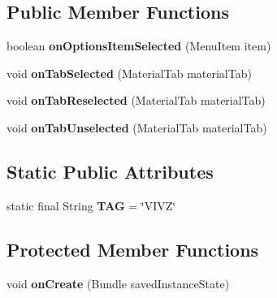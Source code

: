 \subsection*{Public Member Functions}
\begin{DoxyCompactItemize}
\item 
\hypertarget{classantardhvani_1_1du_1_1ac_1_1in_1_1_rules_1_1_rules__viewpager_a09f338b54341174baa0f5c41472619a9}{}boolean {\bfseries on\+Options\+Item\+Selected} (Menu\+Item item)\label{classantardhvani_1_1du_1_1ac_1_1in_1_1_rules_1_1_rules__viewpager_a09f338b54341174baa0f5c41472619a9}

\item 
\hypertarget{classantardhvani_1_1du_1_1ac_1_1in_1_1_rules_1_1_rules__viewpager_ad8bbe8937d526d7f0e01aefbcc0472f1}{}void {\bfseries on\+Tab\+Selected} (Material\+Tab material\+Tab)\label{classantardhvani_1_1du_1_1ac_1_1in_1_1_rules_1_1_rules__viewpager_ad8bbe8937d526d7f0e01aefbcc0472f1}

\item 
\hypertarget{classantardhvani_1_1du_1_1ac_1_1in_1_1_rules_1_1_rules__viewpager_adf1e7481079215663e69307de4caa99d}{}void {\bfseries on\+Tab\+Reselected} (Material\+Tab material\+Tab)\label{classantardhvani_1_1du_1_1ac_1_1in_1_1_rules_1_1_rules__viewpager_adf1e7481079215663e69307de4caa99d}

\item 
\hypertarget{classantardhvani_1_1du_1_1ac_1_1in_1_1_rules_1_1_rules__viewpager_a32f72a3fd78aaaaf97651450c0c06453}{}void {\bfseries on\+Tab\+Unselected} (Material\+Tab material\+Tab)\label{classantardhvani_1_1du_1_1ac_1_1in_1_1_rules_1_1_rules__viewpager_a32f72a3fd78aaaaf97651450c0c06453}

\end{DoxyCompactItemize}
\subsection*{Static Public Attributes}
\begin{DoxyCompactItemize}
\item 
\hypertarget{classantardhvani_1_1du_1_1ac_1_1in_1_1_rules_1_1_rules__viewpager_aa8eafba15478f26e2ca5316003c21c10}{}static final String {\bfseries T\+A\+G} = \char`\"{}V\+I\+V\+Z\char`\"{}\label{classantardhvani_1_1du_1_1ac_1_1in_1_1_rules_1_1_rules__viewpager_aa8eafba15478f26e2ca5316003c21c10}

\end{DoxyCompactItemize}
\subsection*{Protected Member Functions}
\begin{DoxyCompactItemize}
\item 
\hypertarget{classantardhvani_1_1du_1_1ac_1_1in_1_1_rules_1_1_rules__viewpager_ad299625d7f5baf2003346bc964b9fd5e}{}void {\bfseries on\+Create} (Bundle saved\+Instance\+State)\label{classantardhvani_1_1du_1_1ac_1_1in_1_1_rules_1_1_rules__viewpager_ad299625d7f5baf2003346bc964b9fd5e}

\end{DoxyCompactItemize}


